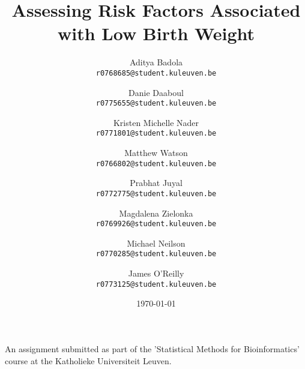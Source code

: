\documentclass[a4paper,10pt]{article}
\numberwithin{equation}{section}
\begin{document}
\title{\huge{\textbf{Assessing Risk Factors Associated with Low Birth Weight}}}

\author{
  Aditya Badola\\
  \small\texttt{r0768685@student.kuleuven.be}
  \and
  Danie Daaboul\\
  \small\texttt{r0775655@student.kuleuven.be}
  \and
  Kristen Michelle Nader\\
  \small\texttt{r0771801@student.kuleuven.be}
  \and
  Matthew Watson\\
  \small\texttt{r0766802@student.kuleuven.be}
  \and
  Prabhat Juyal\\
  \small\texttt{r0772775@student.kuleuven.be}
  \and
  Magdalena Zielonka\\
  \small\texttt{r0769926@student.kuleuven.be}
  \and
  Michael Neilson\\
  \small\texttt{r0770285@student.kuleuven.be}
  \and
  James O'Reilly\\
  \small\texttt{r0773125@student.kuleuven.be}
}
\date{\today}

\maketitle
\thispagestyle{empty}
\vfill
\vspace{-2cm}
\begin{center}
An assignment submitted as part of the 'Statistical Methods for Bioinformatics' course at the Katholieke Universiteit Leuven.
\end{center}
\clearpage
{}

\setlength{\parskip}{1.5ex} %
\setlength{\parindent}{0pt}



\newpage



\end{document}
